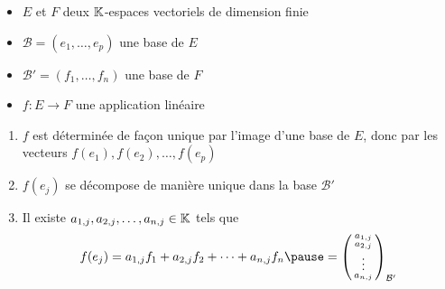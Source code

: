 \begin{frame}

\begin{itemize}
  \item $E$ et $F$ deux $\mathbb{K}$-espaces vectoriels de dimension finie
  \pause
  \item $\mathcal{B}=(e_1, \dots ,e_p)$ une base de $E$
  \pause
  \item $\mathcal{B}'=(f_1, \dots ,f_n)$ une base de $F$
  \pause
  \item $f : E \to F$ une application linéaire
\end{itemize}

\bigskip
\pause

\begin{enumerate}
  \item $f$ est déterminée de façon unique par l'image
d'une base de $E$, donc par les vecteurs 
$f(e_1), f(e_2), \ldots, f(e_p)$
\pause
  
  \item $f(e_j)$ se décompose de manière unique dans la base $\mathcal{B}'$
  \pause
  
  \item Il existe $a_{1,j},a_{2,j}, \ldots , a_{n,j} \in \mathbb{K}$
tels que 
\vspace*{-2ex}
$$f (e_j)=a_{1,j}f_1+a_{2,j}f_2+\dots +a_{n,j}f_n 
\pause = \left(\begin{smallmatrix}a_{1,j}\\a_{2,j}\\ \vdots \\a_{n,j}\end{smallmatrix}\right)_{\mathcal{B}'}$$

\end{enumerate}

\end{frame}


